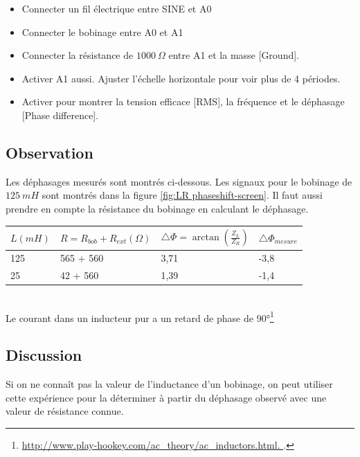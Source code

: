 \documentclass{book}
\begin{document}
\begin{itemize}
  \item Connecter un fil électrique entre SINE et A0
  \item Connecter le bobinage entre A0 et A1
  \item Connecter la résistance de $1000\ \Omega$  entre A1 et la masse [Ground].
  \item Activer A1 aussi. Ajuster l'échelle horizontale pour voir plus de 4 périodes.
  \item Activer   pour montrer la tension efficace [RMS], la fréquence et le déphasage [Phase difference].
\end{itemize}

\subsection{Observation}


Les déphasages mesurés sont montrés ci-dessous. Les signaux pour le bobinage de $125\ mH$  sont montrés dans la figure  \ref{fig:LR  phaseshift-screen}. Il faut aussi prendre en compte la résistance du bobinage en calculant le déphasage.



\begin{tabular}{|l|l|l|l|}
\hline
$L (mH )$&$R=R_{bob}+R_{ext} (\Omega )$&$\bigtriangleup\Phi=\arctan\left(\frac{Z_{L} }{Z_{R} }\right)$&$\bigtriangleup\Phi_{mesure}$
\\ \hline
125&565 + 560&3,71& -3,8
\\ \hline
25&42 + 560&1,39& -1,4
\\ \hline
\end{tabular}\\[0.5em]



Le courant dans un inducteur pur a un retard de phase de 90°\footnote{\href{http://www.play-hookey.com/ac\_theory/ac\_inductors.html}{\mbox{http://www.play-hookey.com/ac\_theory/ac\_inductors.html}.
}.
 }
\subsection{Discussion}


Si on ne connaît pas la valeur de l'inductance d'un bobinage, on peut utiliser cette expérience pour la déterminer à partir du déphasage observé avec une valeur de résistance connue.
\end{document}
